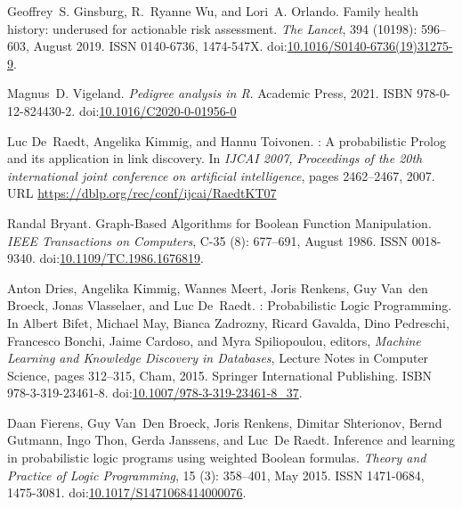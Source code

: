 \documentclass{eptcs}
\providecommand{\urlalt}[2]{\href{#1}{#2}}
\providecommand{\doi}[1]{doi:\urlalt{http://dx.doi.org/#1}{#1}}
\begin{document}
\begin{thebibliography}{}
Geoffrey~S. Ginsburg, R.~Ryanne Wu, and Lori~A. Orlando.
\newblock Family health history: underused for actionable risk assessment.
\newblock \emph{The Lancet}, 394 (10198): 596--603, August 2019.
\newblock ISSN 0140-6736, 1474-547X.
\newblock \doi{10.1016/S0140-6736(19)31275-9}.

Magnus~D. Vigeland.
\newblock \emph{Pedigree analysis in {R}}.
\newblock Academic Press, 2021.
\newblock ISBN 978-0-12-824430-2.
\newblock \doi{10.1016/C2020-0-01956-0}

Luc De~Raedt, Angelika Kimmig, and Hannu Toivonen.
: {A} probabilistic {Prolog} and its application in link discovery.
\newblock In \emph{{IJCAI} 2007, {Proceedings} of the 20th international joint conference on artificial intelligence}, pages 2462--2467, 2007.
\newblock URL \url{https://dblp.org/rec/conf/ijcai/RaedtKT07}

Randal Bryant.
\newblock Graph-{Based} {Algorithms} for {Boolean} {Function} {Manipulation}.
\newblock \emph{IEEE Transactions on Computers}, C-35 (8): 677--691, August 1986.
\newblock ISSN 0018-9340.
\newblock \doi{10.1109/TC.1986.1676819}.

Anton Dries, Angelika Kimmig, Wannes Meert, Joris Renkens, Guy Van~den Broeck, Jonas Vlasselaer, and Luc De~Raedt.
: {Probabilistic} {Logic} {Programming}.
\newblock In Albert Bifet, Michael May, Bianca Zadrozny, Ricard Gavalda, Dino Pedreschi, Francesco Bonchi, Jaime Cardoso, and Myra Spiliopoulou, editors, \emph{Machine {Learning} and {Knowledge} {Discovery} in {Databases}}, Lecture {Notes} in {Computer} {Science}, pages 312--315, Cham, 2015. Springer International Publishing.
\newblock ISBN 978-3-319-23461-8.
\newblock \doi{10.1007/978-3-319-23461-8\_37}.

Daan Fierens, Guy Van~Den Broeck, Joris Renkens, Dimitar Shterionov, Bernd Gutmann, Ingo Thon, Gerda Janssens, and Luc~De Raedt.
\newblock Inference and learning in probabilistic logic programs using weighted {Boolean} formulas.
\newblock \emph{Theory and Practice of Logic Programming}, 15 (3): 358--401, May 2015.
\newblock ISSN 1471-0684, 1475-3081.
\newblock \doi{10.1017/S1471068414000076}.


\end{thebibliography}
\end{document}
